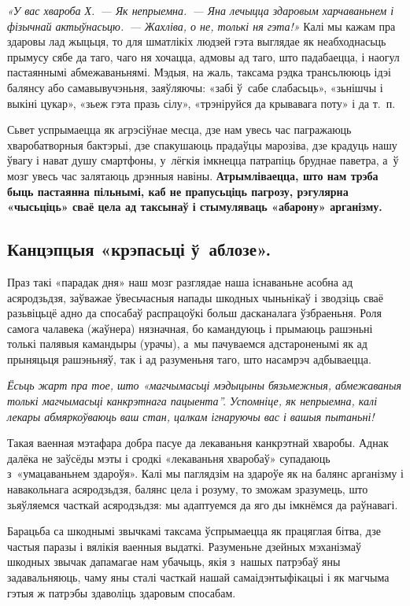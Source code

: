 \emph{«У вас хвароба Х.~--- Як непрыемна.~--- Яна лечыцца здаровым харчаваньнем і фізычнай актыўнасьцю.~--- Жахліва, о не, толькі ня гэта!»} Калі мы кажам пра здаровы лад жыцьця, то для шматлікіх людзей гэта выглядае як неабходнасьць прымусу сябе да таго, чаго ня хочацца, адмовы ад таго, што падабаецца, і наогул пастаяннымі абмежаваньнямі. Мэдыя, на жаль, таксама рэдка трансьлююць ідэі балянсу або самавывучэньня, заяўляючы: «забі ў~сабе слабасьць», «зьнішчы і выкіні цукар», «зьеж гэта празь сілу», «трэніруйся да крывавага поту» і да т.~п.

Сьвет успрымаецца як агрэсіўнае месца, дзе нам увесь час пагражаюць хваробатворныя бактэрыі, дзе спакушаюць прадаўцы марозіва, дзе крадуць нашу ўвагу і нават душу смартфоны, у~лёгкія імкнецца патрапіць бруднае паветра, а~ў мозг увесь час залятаюць дрэнныя навіны. \textbf{Атрымліваецца, што нам трэба быць пастаянна пільнымі, каб не прапусьціць пагрозу, рэгулярна «чысьціць» сваё цела ад таксынаў і стымуляваць «абарону» арганізму.}

\subsection*{Канцэпцыя «крэпасьці ў~аблозе».} 

Праз такі «парадак дня» наш мозг разглядае наша існаваньне асобна ад асяродзьдзя, заўважае ўвесьчасныя напады шкодных чыньнікаў і зводзіць сваё разьвіцьцё адно да спосабаў распрацоўкі больш дасканалага ўзбраеньня. Роля самога чалавека (жаўнера) нязначная, бо камандуюць і прымаюць рашэньні толькі палявыя камандыры (урачы), а~мы пачуваемся адстароненымі як ад прыняцьця рашэньняў, так і ад разуменьня таго, што насамрэч адбываецца. 

\emph{Ёсьць жарт пра тое, што «магчымасьці мэдыцыны бязьмежныя, абмежаваныя толькі магчымасьці канкрэтнага пацыента''. Успомніце, як непрыемна, калі лекары абмяркоўваюць ваш стан, цалкам ігнаруючы вас і вашыя пытаньні!}

Такая ваенная мэтафара добра пасуе да лекаваньня канкрэтнай хваробы. Аднак далёка не заўсёды мэты і сродкі «лекаваньня хваробаў» супадаюць з~«умацаваньнем здароўя». Калі мы паглядзім на здароўе як на балянс арганізму і навакольнага асяродзьдзя, балянс цела і розуму, то зможам зразумець, што зьяўляемся часткай асяродзьдзя: мы адаптуемся да яго ды імкнёмся да раўнавагі.

Барацьба са шкоднымі звычкамі таксама ўспрымаецца як працяглая бітва, дзе частыя паразы і вялікія ваенныя выдаткі. Разуменьне дзейных мэханізмаў шкодных звычак дапамагае нам убачыць, якія з~нашых патрэбаў яны задавальняюць, чаму яны сталі часткай нашай самаідэнтыфікацыі і як магчыма гэтыя ж патрэбы здаволіць здаровым спосабам.

